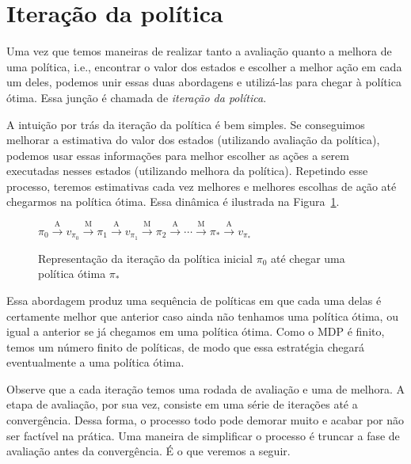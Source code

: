 \documentclass{article}
\begin{document}
    \section{Iteração da política}
    
        Uma vez que temos maneiras de realizar tanto a avaliação quanto a melhora de uma política, i.e., encontrar o valor dos estados e escolher a melhor ação em cada um deles, podemos unir essas duas abordagens e utilizá-las para chegar à política ótima. Essa junção é chamada de \emph{iteração da política}.
        
        A intuição por trás da iteração da política é bem simples. Se conseguimos melhorar a estimativa do valor dos estados (utilizando avaliação da política), podemos usar essas informações para melhor escolher as ações a serem executadas nesses estados (utilizando melhora da política). Repetindo esse processo, teremos estimativas cada vez melhores e melhores escolhas de ação até chegarmos na política ótima. Essa dinâmica é ilustrada na Figura~\ref{fig:policy-iteration}.
        
        \begin{figure}[ht]
            \centering
            \begin{math}
                \pi_0 \xrightarrow{\ \textrm{A} \ } 
                v_{\pi_0} \xrightarrow{\ \textrm{M} \ } 
                \pi_1 \xrightarrow{\ \textrm{A} \ } 
                v_{\pi_1} \xrightarrow{\ \textrm{M} \ } 
                \pi_2 \xrightarrow{\ \textrm{A} \ } 
                \cdots \xrightarrow{\ \textrm{M} \ }
                \pi_* \xrightarrow{\ \textrm{A} \ } v_{\pi_*}
            \end{math}
            \caption{Representação da iteração da política inicial $\pi_0$ até chegar uma política ótima $\pi_*$}
            \label{fig:policy-iteration}
        \end{figure}
        
        Essa abordagem produz uma sequência de políticas em que cada uma delas é certamente melhor que anterior caso ainda não tenhamos uma política ótima, ou igual a anterior se já chegamos em uma política ótima. Como o MDP é finito, temos um número finito de políticas, de modo que essa estratégia chegará eventualmente a uma política ótima.
        
        Observe que a cada iteração temos uma rodada de avaliação e uma de melhora. A etapa de avaliação, por sua vez, consiste em uma série de iterações até a convergência. Dessa forma, o processo todo pode demorar muito e acabar por não ser factível na prática. Uma maneira de simplificar o processo é truncar a fase de avaliação antes da convergência. É o que veremos a seguir.
\end{document}
